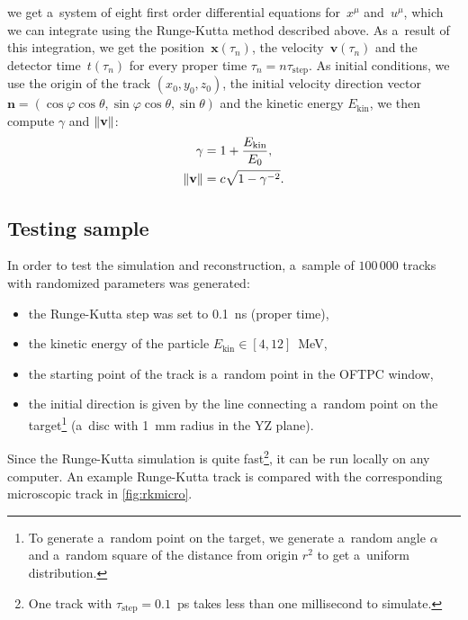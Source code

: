 		we get a~system of eight first order differential equations for~$x^\mu$ and~$u^\mu$, which we can integrate using the Runge-Kutta method described above. As a~result of this integration, we get the position~$\mathbf{x}(\tau_n)$, the velocity~$\mathbf{v}(\tau_n)$ and the detector time~$t(\tau_n)$ for every proper time $\tau_n = n \tau_\text{step}$. As initial conditions, we use the origin of the track $(x_0,y_0,z_0)$, the initial velocity direction vector $\mathbf{n} = (\cos\varphi\cos\theta,\sin\varphi\cos\theta,\sin\theta)$ and the kinetic energy $E_\text{kin}$, we then compute $\gamma$ and $\norm{\mathbf{v}}$:
			\begin{align}
				\gamma &= 1 + \frac{E_\text{kin}}{E_0},\\
				\norm{\mathbf{v}} &= c\sqrt{1-\gamma^{-2}}.
			\end{align}
			
		\subsection{Testing sample}
		\label{sec:rktest}
		
		In order to test the simulation and reconstruction, a~sample of $100\,000$ tracks with randomized parameters was generated:
			\begin{itemize}[topsep=4pt,itemsep=2pt]
				\item the Runge-Kutta step was set to 0.1~ns (proper time),
				\item the kinetic energy of the particle $E_\text{kin} \in [4,12]$~MeV,
				\item the starting point of the track is a~random point in the \ac{OFTPC} window,
				\item the initial direction is given by the line connecting a~random point on the target\footnote{To generate a~random point on the target, we generate a~random angle $\alpha$ and a~random square of the distance from origin $r^2$ to get a~uniform distribution.} (a~disc with 1~mm radius in the YZ plane).
			\end{itemize}
		Since the Runge-Kutta simulation is quite fast\footnote{One track with $\tau_\text{step} = 0.1$~ps takes less than one millisecond to simulate.}, it can be run locally on any computer. An example Runge-Kutta track is compared with the corresponding microscopic track in \cref{fig:rkmicro}.
		
